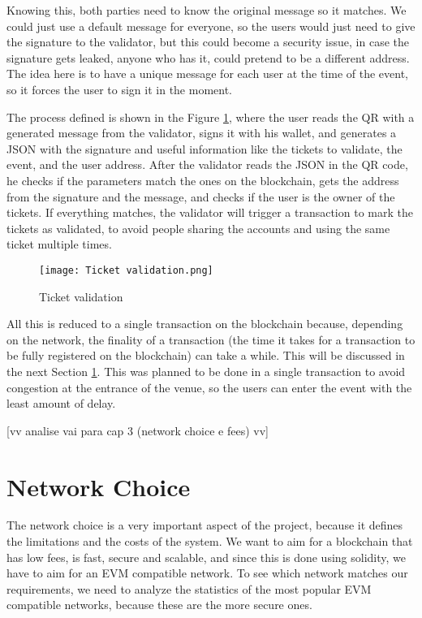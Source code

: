 Knowing this, both parties need to know the original message so it matches. We
could just use a default message for everyone, so the users would just need to
give the signature to the validator, but this could become a security issue, in
case the signature gets leaked, anyone who has it, could pretend to be a
different address. The idea here is to have a unique message for each user at
the time of the event, so it forces the user to sign it in the moment.

The process defined is shown in the Figure \ref{fig:ticket_validation}, where
the user reads the QR with a generated message from the validator, signs it
with his wallet, and generates a JSON with the signature and useful information
like the tickets to validate, the event, and the user address. After the
validator reads the JSON in the QR code, he checks if the parameters match the
ones on the blockchain, gets the address from the signature and the message,
and checks if the user is the owner of the tickets. If everything matches, the
validator will trigger a transaction to mark the tickets as validated, to avoid
people sharing the accounts and using the same ticket multiple times.

\begin{figure}[H]
	\texttt{[image: Ticket validation.png]}
	\centering
	\caption{Ticket validation}
	\label{fig:ticket_validation}
\end{figure}

All this is reduced to a single transaction on the blockchain because,
depending on the network, the finality of a transaction (the time it takes for
a transaction to be fully registered on the blockchain) can take a while. This
will be discussed in the next Section \ref{sec:network_choice}. This was
planned to be done in a single transaction to avoid congestion at the entrance
of the venue, so the users can enter the event with the least amount of delay.

	[vv analise vai para cap 3 (network choice e fees) vv]

\section{Network Choice}
\label{sec:network_choice}

The network choice is a very important aspect of the project, because it
defines the limitations and the costs of the system. We want to aim for a
blockchain that has low fees, is fast, secure and scalable, and since this is
done using solidity, we have to aim for an EVM compatible network. To see which
network matches our requirements, we need to analyze the statistics of the most
popular EVM compatible networks, because these are the more secure ones.

